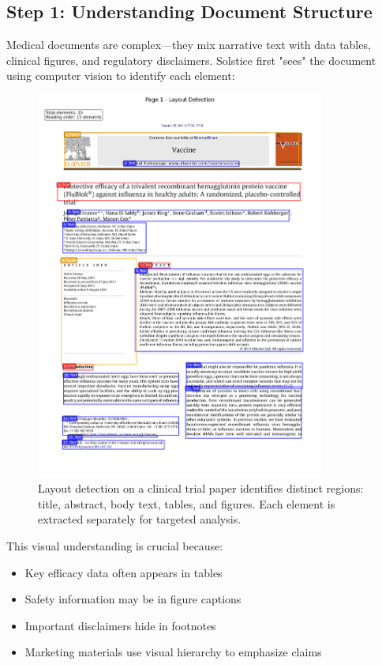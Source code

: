 \documentclass[11pt]{article}
\begin{document}
\subsection{Step 1: Understanding Document Structure}

Medical documents are complex—they mix narrative text with data tables, clinical figures, and regulatory disclaimers. Solstice first "sees" the document using computer vision to identify each element:

\begin{figure}[htbp]
\centering
\includegraphics[width=0.85\textwidth]{scientific_layout_example.png}
\caption{Layout detection on a clinical trial paper identifies distinct regions: title, abstract, body text, tables, and figures. Each element is extracted separately for targeted analysis.}
\end{figure}

This visual understanding is crucial because:
\begin{itemize}
\item Key efficacy data often appears in tables
\item Safety information may be in figure captions
\item Important disclaimers hide in footnotes
\item Marketing materials use visual hierarchy to emphasize claims
\end{itemize}
\end{document}
